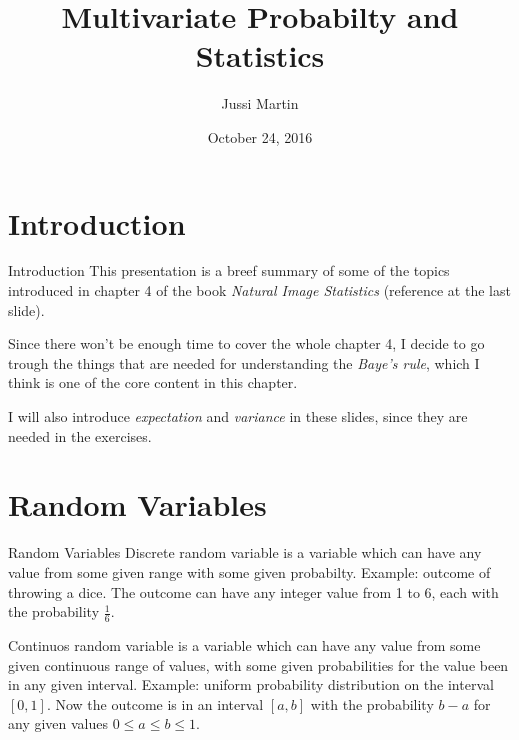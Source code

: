 \documentclass{beamer}
\title[Multivariate Probabilty and Statistics]{Multivariate Probabilty and Statistics}
\author{Jussi Martin}
\date{October 24, 2016}
\begin{document}
\begin{frame}
  \titlepage
\end{frame}


%
%
%
%
%

\section{Introduction}

\begin{frame}{Introduction}
  This presentation is a breef summary of some of the topics introduced in
  chapter 4 of the book \emph{Natural Image Statistics} (reference at
  the last slide).

  Since there won't be enough time to cover the whole chapter 4, I decide to go
  trough the things that are needed for understanding the \emph{Baye's rule},
  which I think is one of the core content in this chapter.

  I will also introduce \emph{expectation} and \emph{variance} in these slides,
  since they are needed in the exercises.
\end{frame}

\section{Random Variables}

\begin{frame}{Random Variables}
 Discrete random variable is a variable which can have any value from some given
 range with some given probabilty. Example: outcome of throwing a dice. The outcome
 can have any integer value from 1 to 6, each with the probability $\frac{1}{6}$.

 Continuos random variable is a variable which can have any value from some given
 continuous range of values, with some given probabilities for the value been in
 any given interval. Example: uniform probability distribution on the interval
 $[0, 1]$. Now the outcome is in an interval $[a, b]$ with the probability $b-a$
 for any given values $0 \le a \le b \le 1$.
\end{frame}
\end{document}
